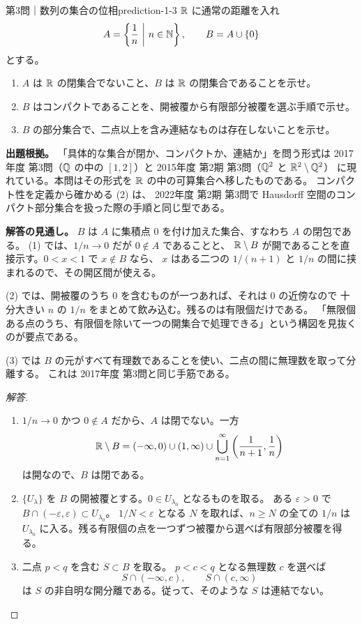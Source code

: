 \begin{problem}{第3問｜数列の集合の位相}{prediction-1-3}
$\mathbb{R}$ に通常の距離を入れ
\[
A=\left\{\frac1n\ \middle|\ n\in\mathbb{N}\right\},
\qquad
B=A\cup\{0\}
\]
とする。
\begin{enumerate}
  \item[(1)] $A$ は $\mathbb{R}$ の閉集合でないこと、$B$ は $\mathbb{R}$ の閉集合であることを示せ。
  \item[(2)] $B$ はコンパクトであることを、開被覆から有限部分被覆を選ぶ手順で示せ。
  \item[(3)] $B$ の部分集合で、二点以上を含み連結なものは存在しないことを示せ。
\end{enumerate}
\end{problem}
\begin{memo*}
\textbf{出題根拠。}
「具体的な集合が閉か、コンパクトか、連結か」を問う形式は
2017年度 第3問（$\mathbb{Q}$ の中の $[1,2]$）と 2015年度 第2期 第3問（$\mathbb{Q}^2$ と $\mathbb{R}^2\setminus\mathbb{Q}^2$）
に現れている。本問はその形式を $\mathbb{R}$ の中の可算集合へ移したものである。
コンパクト性を定義から確かめる (2) は、
2022年度 第2期 第3問で Hausdorff 空間のコンパクト部分集合を扱った際の手順と同じ型である。

\textbf{解答の見通し。}
$B$ は $A$ に集積点 $0$ を付け加えた集合、すなわち $A$ の閉包である。
(1) では、$1/n\to0$ だが $0\notin A$ であることと、
$\mathbb{R}\setminus B$ が開であることを直接示す。$0<x<1$ で $x\notin B$ なら、
$x$ はある二つの $1/(n+1)$ と $1/n$ の間に挟まれるので、その開区間が使える。

(2) では、開被覆のうち $0$ を含むものが一つあれば、それは $0$ の近傍なので
十分大きい $n$ の $1/n$ をまとめて飲み込む。残るのは有限個だけである。
「無限個ある点のうち、有限個を除いて一つの開集合で処理できる」という構図を見抜くのが要点である。

(3) では $B$ の元がすべて有理数であることを使い、二点の間に無理数を取って分離する。
これは 2017年度 第3問と同じ手筋である。
\end{memo*}
\begin{proof}[解答]
\begin{enumerate}
  \item[(1)] $1/n\to0$ かつ $0\notin A$ だから、$A$ は閉でない。一方
  \[
  \mathbb{R}\setminus B=(-\infty,0)\cup(1,\infty)
  \cup\bigcup_{n=1}^\infty\left(\frac1{n+1},\frac1n\right)
  \]
  は開なので、$B$ は閉である。

  \item[(2)] $\{U_\lambda\}$ を $B$ の開被覆とする。$0\in U_{\lambda_0}$ となるものを取る。
  ある $\varepsilon>0$ で
  $B\cap(-\varepsilon,\varepsilon)\subset U_{\lambda_0}$。
  $1/N<\varepsilon$ となる $N$ を取れば、$n\ge N$ の全ての $1/n$ は
  $U_{\lambda_0}$ に入る。残る有限個の点を一つずつ被覆から選べば有限部分被覆を得る。

  \item[(3)] 二点 $p<q$ を含む $S\subset B$ を取る。
  $p<c<q$ となる無理数 $c$ を選べば
  \[
  S\cap(-\infty,c),\qquad S\cap(c,\infty)
  \]
  は $S$ の非自明な開分離である。従って、そのような $S$ は連結でない。
\end{enumerate}
\end{proof}

